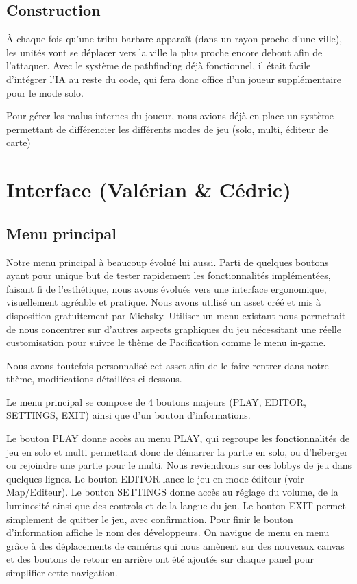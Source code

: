 \documentclass[12pt]{report}
\begin{document}
\subsection{Construction}

À chaque fois qu’une tribu barbare apparaît (dans un rayon proche d’une ville),
les unités vont se déplacer vers la ville la plus proche encore debout afin de
l’attaquer. Avec le système de pathfinding déjà fonctionnel, il était facile
d’intégrer l’IA au reste du code, qui fera donc office d’un joueur
supplémentaire pour le mode solo.

Pour gérer les malus internes du joueur, nous avions déjà en place un système
permettant de différencier les différents modes de jeu (solo, multi, éditeur de
carte)

\section{Interface (Valérian \& Cédric)}

\subsection{Menu principal}

Notre menu principal à beaucoup évolué lui aussi. Parti de quelques boutons
ayant pour unique but de tester rapidement les fonctionnalités implémentées,
faisant fi de l’esthétique, nous avons évolués vers une interface ergonomique,
visuellement agréable et pratique. Nous avons utilisé un asset créé et mis à
disposition gratuitement par Michsky. Utiliser un menu existant nous permettait
de nous concentrer sur d’autres aspects graphiques du jeu nécessitant une réelle
customisation pour suivre le thème de Pacification comme le menu in-game.

Nous avons toutefois personnalisé cet asset afin de le faire rentrer dans notre
thème, modifications détaillées ci-dessous.

Le menu principal se compose de 4 boutons majeurs (PLAY, EDITOR, SETTINGS, EXIT)
ainsi que d’un bouton d’informations. 

Le bouton PLAY donne accès au menu PLAY, qui regroupe les fonctionnalités de jeu
en solo et multi permettant donc de démarrer la partie en solo, ou d'héberger ou
rejoindre une partie pour le multi. Nous reviendrons sur ces lobbys de jeu dans
quelques lignes. Le bouton EDITOR lance le jeu en mode éditeur (voir
Map/Editeur). Le bouton SETTINGS donne accès au réglage du volume, de la
luminosité ainsi que des controls et de la langue du jeu. Le bouton EXIT permet
simplement de quitter le jeu, avec confirmation. Pour finir le bouton
d’information affiche le nom des développeurs. On navigue de menu en menu grâce
à des déplacements de caméras qui nous amènent sur des nouveaux canvas et des
boutons de retour en arrière ont été ajoutés sur chaque panel pour simplifier
cette navigation.
\end{document}
